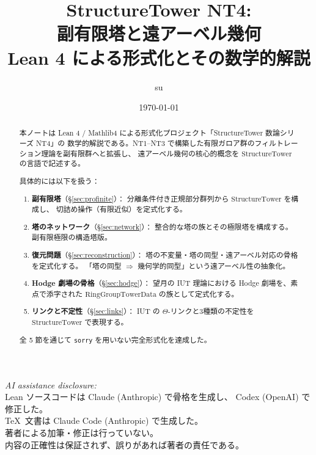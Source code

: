 \documentclass[a4paper,11pt]{ltjsarticle}
\theoremstyle{definition}
\theoremstyle{plain}
\theoremstyle{remark}
\begin{document}
\title{%
  {\LARGE\sffamily\bfseries StructureTower NT4:\\[0.3em]
   副有限塔と遠アーベル幾何}\\[0.5em]
  {\large\sffamily Lean 4 による形式化とその数学的解説}%
}
\author{su}
\date{\today}
\maketitle

\begin{center}
\small
\textit{AI assistance disclosure:}\\
Lean ソースコードは Claude (Anthropic) で骨格を生成し、
Codex (OpenAI) で修正した。\\
\TeX\ 文書は Claude Code (Anthropic) で生成した。\\
著者による加筆・修正は行っていない。\\
内容の正確性は保証されず、誤りがあれば著者の責任である。
\end{center}

\vspace{1em}

\begin{abstract}
本ノートは Lean 4 / Mathlib4 による形式化プロジェクト「StructureTower 数論シリーズ NT4」の
数学的解説である。NT1--NT3 で構築した有限ガロア群のフィルトレーション理論を副有限群へと拡張し、
遠アーベル幾何の核心的概念を \(\mathrm{StructureTower}\) の言語で記述する。

具体的には以下を扱う：
\begin{enumerate}
  \item \textbf{副有限塔}（\S\ref{sec:profinite}）：
    分離条件付き正規部分群列から \(\mathrm{StructureTower}\) を構成し、
    切詰め操作（有限近似）を定式化する。
  \item \textbf{塔のネットワーク}（\S\ref{sec:network}）：
    整合的な塔の族とその極限塔を構成する。副有限極限の構造塔版。
  \item \textbf{復元問題}（\S\ref{sec:reconstruction}）：
    塔の不変量・塔の同型・遠アーベル対応の骨格を定式化する。
    「塔の同型 \(\Rightarrow\) 幾何学的同型」という遠アーベル性の抽象化。
  \item \textbf{Hodge 劇場の骨格}（\S\ref{sec:hodge}）：
    望月の IUT 理論における Hodge 劇場を、素点で添字された
    \(\mathrm{RingGroupTowerData}\) の族として定式化する。
  \item \textbf{リンクと不定性}（\S\ref{sec:links}）：
    IUT の \(\Theta\)-リンクと3種類の不定性を \(\mathrm{StructureTower}\) で表現する。
\end{enumerate}

全 5 節を通じて \texttt{sorry} を用いない完全形式化を達成した。
\end{abstract}
\end{document}
